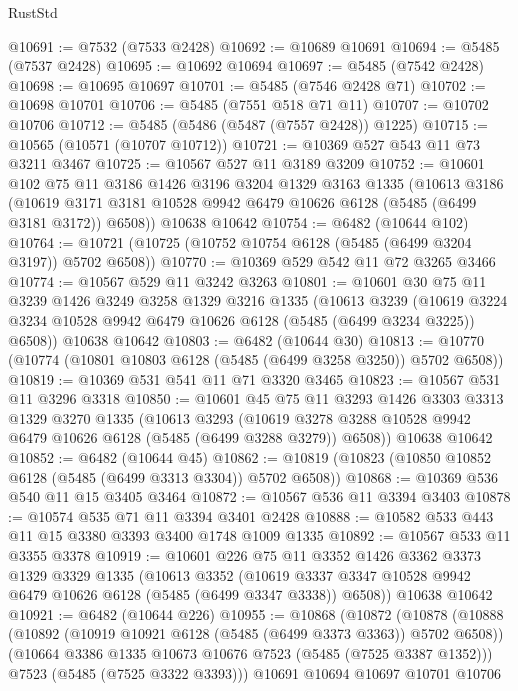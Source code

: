 \begin{lexlean}{RustStd}
\begin{coremodule}
@10691 := @7532 (@7533 @2428)
@10692 := @10689 @10691
@10694 := @5485 (@7537 @2428)
@10695 := @10692 @10694
@10697 := @5485 (@7542 @2428)
@10698 := @10695 @10697
@10701 := @5485 (@7546 @2428 @71)
@10702 := @10698 @10701
@10706 := @5485 (@7551 @518 @71 @11)
@10707 := @10702 @10706
@10712 := @5485 (@5486 (@5487 (@7557 @2428)) @1225)
@10715 := @10565 (@10571 (@10707 @10712))
@10721 := @10369 @527 @543 @11 @73 @3211 @3467
@10725 := @10567 @527 @11 @3189 @3209
@10752 := @10601
    @102
    @75
    @11
    @3186
    @1426
    @3196
    @3204
    @1329
    @3163
    @1335
    (@10613
      @3186
      (@10619 @3171 @3181 @10528 @9942 @6479 @10626 @6128 (@5485 (@6499 @3181 @3172)) @6508))
    @10638
    @10642
@10754 := @6482 (@10644 @102)
@10764 := @10721 (@10725 (@10752 @10754 @6128 (@5485 (@6499 @3204 @3197)) @5702 @6508))
@10770 := @10369 @529 @542 @11 @72 @3265 @3466
@10774 := @10567 @529 @11 @3242 @3263
@10801 := @10601
    @30
    @75
    @11
    @3239
    @1426
    @3249
    @3258
    @1329
    @3216
    @1335
    (@10613
      @3239
      (@10619 @3224 @3234 @10528 @9942 @6479 @10626 @6128 (@5485 (@6499 @3234 @3225)) @6508))
    @10638
    @10642
@10803 := @6482 (@10644 @30)
@10813 := @10770 (@10774 (@10801 @10803 @6128 (@5485 (@6499 @3258 @3250)) @5702 @6508))
@10819 := @10369 @531 @541 @11 @71 @3320 @3465
@10823 := @10567 @531 @11 @3296 @3318
@10850 := @10601
    @45
    @75
    @11
    @3293
    @1426
    @3303
    @3313
    @1329
    @3270
    @1335
    (@10613
      @3293
      (@10619 @3278 @3288 @10528 @9942 @6479 @10626 @6128 (@5485 (@6499 @3288 @3279)) @6508))
    @10638
    @10642
@10852 := @6482 (@10644 @45)
@10862 := @10819 (@10823 (@10850 @10852 @6128 (@5485 (@6499 @3313 @3304)) @5702 @6508))
@10868 := @10369 @536 @540 @11 @15 @3405 @3464
@10872 := @10567 @536 @11 @3394 @3403
@10878 := @10574 @535 @71 @11 @3394 @3401 @2428
@10888 := @10582 @533 @443 @11 @15 @3380 @3393 @3400 @1748 @1009 @1335
@10892 := @10567 @533 @11 @3355 @3378
@10919 := @10601
    @226
    @75
    @11
    @3352
    @1426
    @3362
    @3373
    @1329
    @3329
    @1335
    (@10613
      @3352
      (@10619 @3337 @3347 @10528 @9942 @6479 @10626 @6128 (@5485 (@6499 @3347 @3338)) @6508))
    @10638
    @10642
@10921 := @6482 (@10644 @226)
@10955 := @10868
    (@10872
      (@10878
        (@10888
          (@10892 (@10919 @10921 @6128 (@5485 (@6499 @3373 @3363)) @5702 @6508))
          (@10664 @3386 @1335 @10673 @10676 @7523 (@5485 (@7525 @3387 @1352)))
          @7523
          (@5485 (@7525 @3322 @3393)))
        @10691
        @10694
        @10697
        @10701
        @10706

\end{coremodule}
\end{lexlean}
